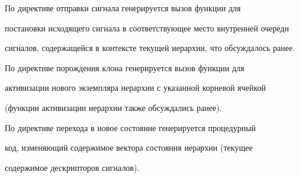       


      По директиве отправки сигнала генерируется вызов функции для 


постановки исходящего сигнала в соответствующее место внутренней очереди 


сигналов, содержащейся в контексте текущей иерархии, что обсуждалось ранее.


      


      По директиве порождения клона генерируется вызов функции для 


активизации нового экземпляра иерархии с указанной корневой ячейкой 


(функции активизации иерархии также обсуждались ранее).


      


      По директиве перехода в новое состояние генерируется процедурный 


код, изменяющий содержимое вектора состояния иерархии (текущее 


содержимое дескрипторов сигналов). 


